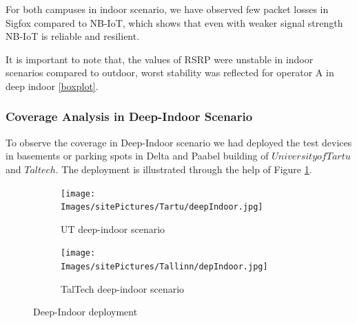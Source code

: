 \documentclass[12pt]{article}
\begin{document}
For both campuses in indoor scenario, we have observed few packet losses in Sigfox compared to NB-IoT, which shows that even with weaker signal strength NB-IoT is reliable and resilient.\par

It is important to note that, the values of RSRP were unstable in indoor scenarios compared to outdoor, worst stability was reflected for operator A in deep indoor \ref{boxplot}.

\subsubsection{Coverage Analysis in Deep-Indoor Scenario} \label{deep-indoor analysis}
To observe the coverage in Deep-Indoor scenario we had deployed the test devices in basements or parking spots in Delta and Paabel building of $University of Tartu$ and $Taltech$. The deployment is illustrated through the help of Figure \ref{fig:Deep-Indoor deployment}.

\begin{figure}[H]
\centering
\begin{subfigure}[t]{0.42 \columnwidth}
  \centering
  \texttt{[image: Images/sitePictures/Tartu/deepIndoor.jpg]}
  \caption{UT deep-indoor scenario}
  \end{subfigure}
  
  \begin{subfigure}[t]{0.42 \columnwidth}
    \centering
    \texttt{[image: Images/sitePictures/Tallinn/depIndoor.jpg]}
    \caption{TalTech deep-indoor scenario}
  \end{subfigure}
   
    \caption{Deep-Indoor deployment}
    \label{fig:Deep-Indoor deployment}
\end{figure}
\end{document}
